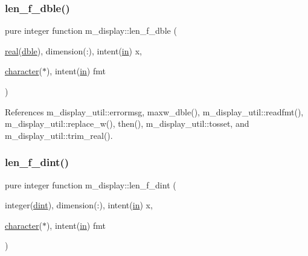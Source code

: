 \mbox{\label{namespacem__display_aa013a639d5b0f7e40b627c9d712693f0}} 
\subsubsection{\texorpdfstring{len\+\_\+f\+\_\+dble()}{len\_f\_dble()}}
{\footnotesize\ttfamily pure integer function m\+\_\+display\+::len\+\_\+f\+\_\+dble (\begin{DoxyParamCaption}\item[{\hyperlink{read__watch_83_8txt_abdb62bde002f38ef75f810d3a905a823}{real}(\hyperlink{namespacem__display_a46d90b75b6ccef7ccade133e5847e815}{dble}), dimension(\+:), intent(\hyperlink{M__journal_83_8txt_afce72651d1eed785a2132bee863b2f38}{in})}]{x,  }\item[{\hyperlink{option__stopwatch_83_8txt_abd4b21fbbd175834027b5224bfe97e66}{character}($\ast$), intent(\hyperlink{M__journal_83_8txt_afce72651d1eed785a2132bee863b2f38}{in})}]{fmt }\end{DoxyParamCaption})\hspace{0.3cm}{\ttfamily [private]}}



References m\+\_\+display\+\_\+util\+::errormsg, maxw\+\_\+dble(), m\+\_\+display\+\_\+util\+::readfmt(), m\+\_\+display\+\_\+util\+::replace\+\_\+w(), then(), m\+\_\+display\+\_\+util\+::tosset, and m\+\_\+display\+\_\+util\+::trim\+\_\+real().

\mbox{\label{namespacem__display_a6a2709cf5f243ee492f223b40c6b5143}} 
\subsubsection{\texorpdfstring{len\+\_\+f\+\_\+dint()}{len\_f\_dint()}}
{\footnotesize\ttfamily pure integer function m\+\_\+display\+::len\+\_\+f\+\_\+dint (\begin{DoxyParamCaption}\item[{integer(\hyperlink{namespacem__display_a73f772e9702cad6f40b78364fde2c7cd}{dint}), dimension(\+:), intent(\hyperlink{M__journal_83_8txt_afce72651d1eed785a2132bee863b2f38}{in})}]{x,  }\item[{\hyperlink{option__stopwatch_83_8txt_abd4b21fbbd175834027b5224bfe97e66}{character}($\ast$), intent(\hyperlink{M__journal_83_8txt_afce72651d1eed785a2132bee863b2f38}{in})}]{fmt }\end{DoxyParamCaption})\hspace{0.3cm}{\ttfamily [private]}}



